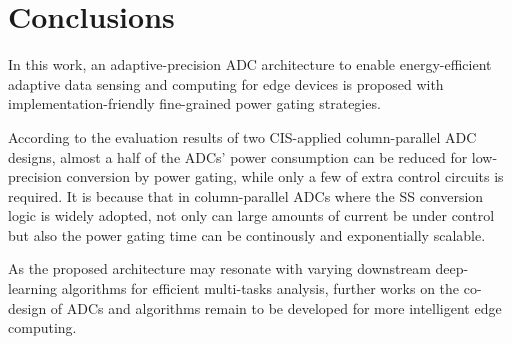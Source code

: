 \section{Conclusions}\label{conclusion}

In this work, an adaptive-precision ADC architecture to enable energy-efficient adaptive data sensing and computing for edge devices is proposed with implementation-friendly fine-grained power gating strategies.

According to the evaluation results of two CIS-applied column-parallel ADC designs, almost a half of the ADCs’ power consumption can be reduced for low-precision conversion by power gating, 
while only a few of extra control circuits is required.
It is because that in column-parallel ADCs where the SS conversion logic is widely adopted, not only can large amounts of current be under control but also the power gating time can be continously and exponentially scalable. 

As the proposed architecture may resonate with varying downstream deep-learning algorithms for efficient multi-tasks analysis, further works on the co-design of ADCs and algorithms remain to be developed for more intelligent edge computing.